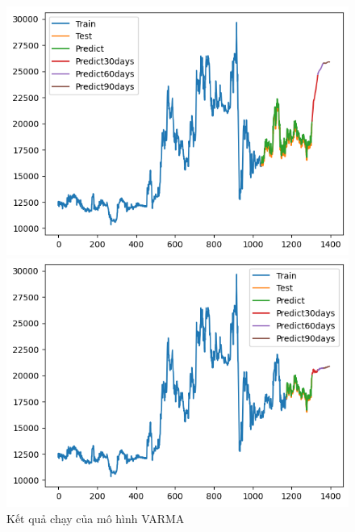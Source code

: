 \begin{figure}[H]
\begin{minipage}{0.15\textwidth}
    \end{minipage}
    \hfill
    \begin{minipage}{0.15\textwidth}
    \centering
    \includegraphics[width=1\textwidth]{resources/chapter-5/newdata1/result/EIB_ RNN_8-2.png}
    \end{minipage}
    \hfill
        \begin{minipage}{0.15\textwidth}
    \centering
    \includegraphics[width=1\textwidth]{resources/chapter-5/newdata1/result/EIB_ RNN_9-1.png}
    \end{minipage}
    \hfill
    
    \caption{Kết quả chạy của mô hình VARMA}
    \label{fig:RNN}
\end{figure}


